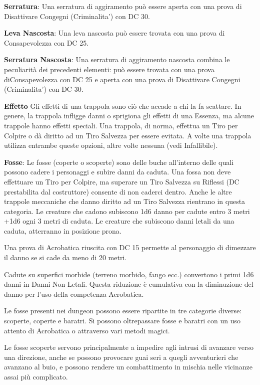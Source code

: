 \documentclass[a4paper,11pt,twoside,openany]{book}
\begin{document}
{\textbf{Serratura}: Una serratura di aggiramento può essere aperta con una prova di Disattivare Congegni (Criminalita') con DC 30.

\textbf{Leva Nascosta}: Una leva nascosta può essere trovata con una prova di Consapevolezza con DC 25.

\textbf{Serratura Nascosta}: Una serratura di aggiramento nascosta combina le peculiarità dei precedenti elementi: può essere trovata con una prova diConsapevolezza con DC 25 e aperta con una prova di Disattivare Congegni (Criminalita') con DC 30.

\textbf{Effetto}
Gli effetti di una trappola sono ciò che accade a chi la fa scattare. In genere, la trappola infligge danni o sprigiona gli effetti di una Essenza, ma alcune trappole hanno effetti speciali. Una trappola, di norma, effettua un Tiro per Colpire o dà diritto ad un Tiro Salvezza per essere evitata. A volte una trappola utilizza entrambe queste opzioni, altre volte nessuna (vedi Infallibile).

\textbf{Fosse}: Le fosse (coperte o scoperte) sono delle buche all'interno delle quali possono cadere i personaggi e subire danni da caduta. Una fossa non deve effettuare un Tiro per Colpire, ma superare un Tiro Salvezza su Riflessi (DC prestabilita dal costruttore) consente di non caderci dentro. Anche le altre trappole meccaniche che danno diritto ad un Tiro Salvezza rientrano in questa categoria. Le creature che cadono subiscono 1d6 danno per cadute entro 3 metri +1d6 ogni 3 metri di caduta. Le creature che subiscono danni letali da una caduta,
atterranno in posizione prona.
 
Una prova di Acrobatica riuscita con DC 15 permette al personaggio di dimezzare il danno se si cade da meno di 20 metri.

Cadute su superfici morbide (terreno morbido, fango ecc.) convertono i primi 1d6 danni in Danni Non Letali. Questa riduzione è cumulativa con la diminuzione del danno per l'uso della competenza Acrobatica.

Le fosse presenti nei dungeon possono essere ripartite in tre categorie diverse: scoperte, coperte e baratri. Si possono oltrepassare fosse e baratri con un uso attento di Acrobatica o attraverso vari metodi magici.

Le fosse scoperte servono principalmente a impedire agli intrusi di avanzare verso una direzione, anche se possono provocare guai seri a quegli avventurieri che avanzano al buio, e possono rendere un combattimento in mischia nelle vicinanze assai più complicato.

}
\end{document}
